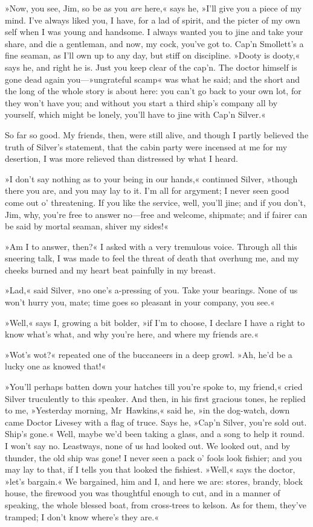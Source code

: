 »Now, you see, Jim, so be as you \textit{are} here,« says he, »I'll give you a piece of my mind. I've always liked you, I have, for a lad of spirit, and the picter of my own self when I was young and handsome. I always wanted you to jine and take your share, and die a gentleman, and now, my cock, you've got to. Cap'n Smollett's a fine seaman, as I'll own up to any day, but stiff on discipline. »Dooty is dooty,« says he, and right he is. Just you keep clear of the cap'n. The doctor himself is gone dead again you—»ungrateful scamp« was what he said; and the short and the long of the whole story is about here: you can't go back to your own lot, for they won't have you; and without you start a third ship's company all by yourself, which might be lonely, you'll have to jine with Cap'n Silver.«

So far so good. My friends, then, were still alive, and though I partly believed the truth of Silver's statement, that the cabin party were incensed at me for my desertion, I was more relieved than distressed by what I heard.

»I don't say nothing as to your being in our hands,« continued Silver, »though there you are, and you may lay to it. I'm all for argyment; I never seen good come out o' threatening. If you like the service, well, you'll jine; and if you don't, Jim, why, you're free to answer no—free and welcome, shipmate; and if fairer can be said by mortal seaman, shiver my sides!«

»Am I to answer, then?« I asked with a very tremulous voice. Through all this sneering talk, I was made to feel the threat of death that overhung me, and my cheeks burned and my heart beat painfully in my breast.

»Lad,« said Silver, »no one's a-pressing of you. Take your bearings. None of us won't hurry you, mate; time goes so pleasant in your company, you see.«

»Well,« says I, growing a bit bolder, »if I'm to choose, I declare I have a right to know what's what, and why you're here, and where my friends are.«

»Wot's wot?« repeated one of the buccaneers in a deep growl. »Ah, he'd be a lucky one as knowed that!«

»You'll perhaps batten down your hatches till you're spoke to, my friend,« cried Silver truculently to this speaker. And then, in his first gracious tones, he replied to me, »Yesterday morning, Mr~Hawkins,« said he, »in the dog-watch, down came Doctor Livesey with a flag of truce. Says he, »Cap'n Silver, you're sold out. Ship's gone.« Well, maybe we'd been taking a glass, and a song to help it round. I won't say no. Leastways, none of us had looked out. We looked out, and by thunder, the old ship was gone! I never seen a pack o' fools look fishier; and you may lay to that, if I tells you that looked the fishiest. »Well,« says the doctor, »let's bargain.« We bargained, him and I, and here we are: stores, brandy, block house, the firewood you was thoughtful enough to cut, and in a manner of speaking, the whole blessed boat, from cross-trees to kelson. As for them, they've tramped; I don't know where's they are.«

